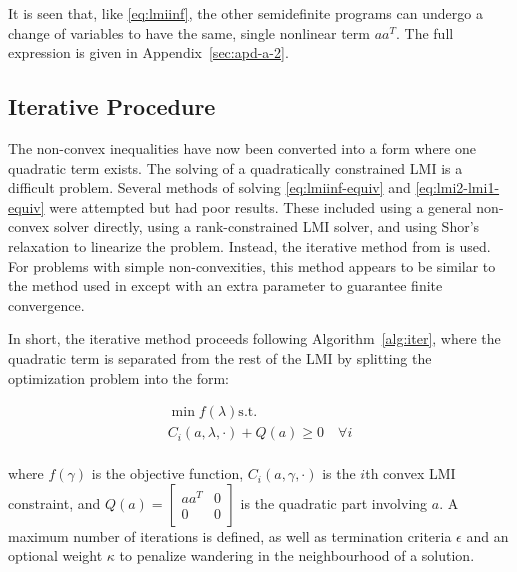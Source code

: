 It is seen that, like \autoref{eq:lmiinf}, the other semidefinite programs can undergo a change of variables to have the same, single nonlinear term $aa^T$. The full expression is given in Appendix~\ref{sec:apd-a-2}.

\subsection{Iterative Procedure}

The non-convex inequalities have now been converted into a form where one quadratic term exists. The solving of a quadratically constrained \gls{LMI} is a difficult problem. Several methods of solving \autoref{eq:lmiinf-equiv} and \autoref{eq:lmi2-lmi1-equiv} were attempted but had poor results. These included using a general non-convex solver directly, using a rank-constrained LMI solver, and using Shor's relaxation to linearize the problem. Instead, the iterative method from \cite{Shishkin2017} is used. For problems with simple non-convexities, this method appears to be similar to the method used in \cite{Li2014} except with an extra parameter to guarantee finite convergence. 

In short, the iterative method proceeds following Algorithm~\ref{alg:iter}, where the quadratic term is separated from the rest of the \gls{LMI} by splitting the optimization problem into the form:

\begin{equation} \label{eq:opt-prb}
	\begin{gathered}
		\min f(\lambda) \mathrm{ s.t.} \\
		C_i(a, \lambda, \cdot) + Q(a) \geq 0 \quad \forall i \\	
	\end{gathered}
\end{equation}

where $f(\gamma)$ is the objective function, $C_i(a, \gamma, \cdot)$ is the $i$th convex \gls{LMI} constraint, and $Q(a)=\begin{bmatrix} aa^T & 0 \\ 0 & 0 \end{bmatrix}$ is the quadratic part involving $a$. A maximum number of iterations  is defined, as well as termination criteria $\epsilon$ and an optional weight $\kappa$ to penalize wandering in the neighbourhood of a solution.

